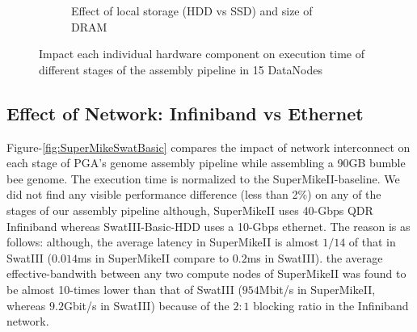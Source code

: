 \documentclass[conference]{IEEEtran}
\begin{document}
\begin{figure}[htb]
\begin{subfigure}[b]{0.23\textwidth}
                \caption{Effect of local storage (HDD vs SSD) and size of DRAM}
                \label{fig:SuperMikeSwatStorageMemory}
   \end{subfigure}
   \caption{Impact each individual hardware component on execution time of different stages of the assembly pipeline in 15 DataNodes }
  \label{fig:SuperMikeSwat}
  \vspace{-1.5em}
\end{figure}


\subsection {Effect of Network: Infiniband vs Ethernet} \label{EffectOfNetwork}
Figure-\ref{fig:SuperMikeSwatBasic} compares the impact of network interconnect on each stage of PGA's genome assembly pipeline while assembling a 90GB bumble bee genome. 
The execution time is normalized to the SuperMikeII-baseline. %
We did not find any visible performance difference (less than 2\%) on any of the stages of our assembly pipeline although, SuperMikeII uses 40-Gbps QDR Infiniband whereas SwatIII-Basic-HDD uses a 10-Gbps ethernet. 
The reason is as follows: 
although, the average latency in SuperMikeII is almost $1/14$ of that in SwatIII ($0.014$ms in SuperMikeII compare to $0.2$ms in SwatIII). 
the average effective-bandwith between any two compute nodes of SuperMikeII was found to be almost 10-times lower than that of SwatIII ($954$Mbit/s in SuperMikeII, whereas $9.2$Gbit/s in SwatIII) because of the $2:1$ blocking ratio in the Infiniband network. 
 
\end{document}
